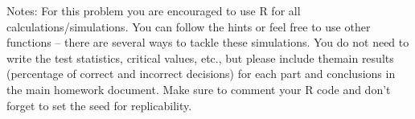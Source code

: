 \documentclass[]{article}
\begin{document}
Notes: For this problem you are encouraged to use R for all
calculations/simulations. You can follow the hints or feel free to use
other functions -- there are several ways to tackle these simulations.
You do not need to write the test statistics, critical values, etc., but
please include themain results (percentage of correct and incorrect
decisions) for each part and conclusions in the main homework document.
Make sure to comment your R code and don't forget to set the seed for
replicability.
\end{document}
